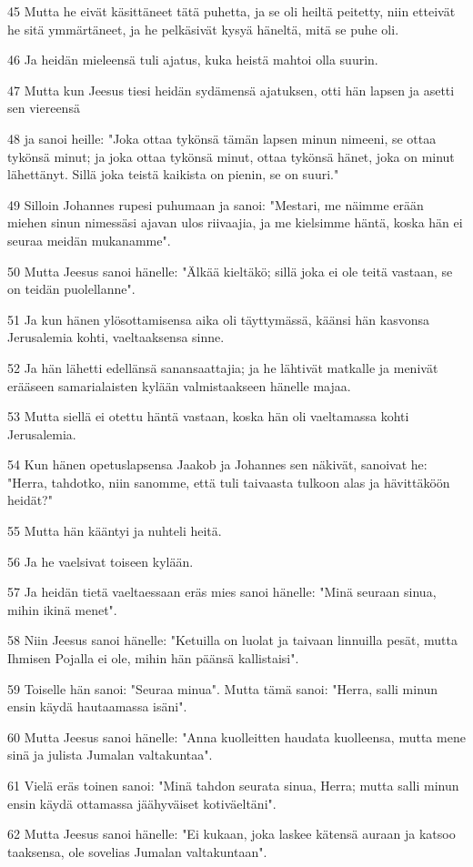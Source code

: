 \par 45 Mutta he eivät käsittäneet tätä puhetta, ja se oli heiltä peitetty, niin etteivät he sitä ymmärtäneet, ja he pelkäsivät kysyä häneltä, mitä se puhe oli.
\par 46 Ja heidän mieleensä tuli ajatus, kuka heistä mahtoi olla suurin.
\par 47 Mutta kun Jeesus tiesi heidän sydämensä ajatuksen, otti hän lapsen ja asetti sen viereensä
\par 48 ja sanoi heille: "Joka ottaa tykönsä tämän lapsen minun nimeeni, se ottaa tykönsä minut; ja joka ottaa tykönsä minut, ottaa tykönsä hänet, joka on minut lähettänyt. Sillä joka teistä kaikista on pienin, se on suuri."
\par 49 Silloin Johannes rupesi puhumaan ja sanoi: "Mestari, me näimme erään miehen sinun nimessäsi ajavan ulos riivaajia, ja me kielsimme häntä, koska hän ei seuraa meidän mukanamme".
\par 50 Mutta Jeesus sanoi hänelle: "Älkää kieltäkö; sillä joka ei ole teitä vastaan, se on teidän puolellanne".
\par 51 Ja kun hänen ylösottamisensa aika oli täyttymässä, käänsi hän kasvonsa Jerusalemia kohti, vaeltaaksensa sinne.
\par 52 Ja hän lähetti edellänsä sanansaattajia; ja he lähtivät matkalle ja menivät erääseen samarialaisten kylään valmistaakseen hänelle majaa.
\par 53 Mutta siellä ei otettu häntä vastaan, koska hän oli vaeltamassa kohti Jerusalemia.
\par 54 Kun hänen opetuslapsensa Jaakob ja Johannes sen näkivät, sanoivat he: "Herra, tahdotko, niin sanomme, että tuli taivaasta tulkoon alas ja hävittäköön heidät?"
\par 55 Mutta hän kääntyi ja nuhteli heitä.
\par 56 Ja he vaelsivat toiseen kylään.
\par 57 Ja heidän tietä vaeltaessaan eräs mies sanoi hänelle: "Minä seuraan sinua, mihin ikinä menet".
\par 58 Niin Jeesus sanoi hänelle: "Ketuilla on luolat ja taivaan linnuilla pesät, mutta Ihmisen Pojalla ei ole, mihin hän päänsä kallistaisi".
\par 59 Toiselle hän sanoi: "Seuraa minua". Mutta tämä sanoi: "Herra, salli minun ensin käydä hautaamassa isäni".
\par 60 Mutta Jeesus sanoi hänelle: "Anna kuolleitten haudata kuolleensa, mutta mene sinä ja julista Jumalan valtakuntaa".
\par 61 Vielä eräs toinen sanoi: "Minä tahdon seurata sinua, Herra; mutta salli minun ensin käydä ottamassa jäähyväiset kotiväeltäni".
\par 62 Mutta Jeesus sanoi hänelle: "Ei kukaan, joka laskee kätensä auraan ja katsoo taaksensa, ole sovelias Jumalan valtakuntaan".

